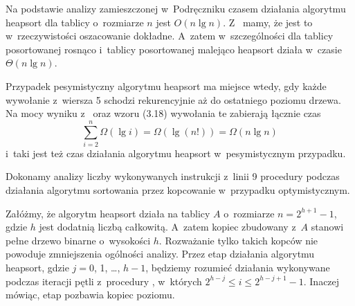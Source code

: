 \exercise %
Na podstawie analizy zamieszczonej w~Podręczniku czasem działania algorytmu heapsort dla tablicy o~rozmiarze $n$ jest $O(n\lg n)$.
Z~ mamy, że jest to w~rzeczywistości oszacowanie dokładne.
A~zatem w~szczególności dla tablicy posortowanej rosnąco i~tablicy posortowanej malejąco heapsort działa w~czasie $\Theta(n\lg n)$.

\exercise %
Przypadek pesymistyczny algorytmu heapsort ma miejsce wtedy, gdy każde wywołanie  z~wiersza 5 schodzi rekurencyjnie aż do ostatniego poziomu drzewa.
Na mocy wyniku z~ oraz wzoru (3.18) wywołania te zabierają łącznie czas
\[
	\sum_{i=2}^n\Omega(\lg i) = \Omega(\lg(n!)) = \Omega(n\lg n)
\]
i~taki jest też czas działania algorytmu heapsort w~pesymistycznym przypadku.

\exercise %
Dokonamy analizy liczby wykonywanych instrukcji z~linii 9 procedury  podczas działania algorytmu sortowania przez kopcowanie w~przypadku optymistycznym.

Załóżmy, że algorytm heapsort działa na tablicy $A$ o~rozmiarze $n=2^{h+1}-1$, gdzie $h$ jest dodatnią liczbą całkowitą.
A~zatem kopiec zbudowany z~$A$ stanowi pełne drzewo binarne o~wysokości $h$.
Rozważanie tylko takich kopców nie powoduje zmniejszenia ogólności analizy.
Przez  etap działania algorytmu heapsort, gdzie $j=0$, 1, \dots, $h-1$, będziemy rozumieć działania wykonywane podczas iteracji pętli  z~procedury , w~których $2^{h-j}\le i\le2^{h-j+1}-1$.
Inaczej mówiąc,  etap pozbawia kopiec  poziomu.

